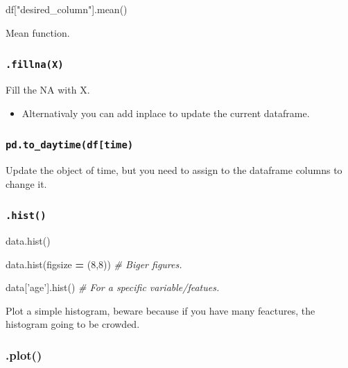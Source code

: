 \documentclass[]{book}
\newenvironment{Shaded}{\begin{snugshade}}{\end{snugshade}}
\newcommand{\DecValTok}[1]{\textcolor[rgb]{0.00,0.00,0.81}{#1}}
\newcommand{\StringTok}[1]{\textcolor[rgb]{0.31,0.60,0.02}{#1}}
\newcommand{\CommentTok}[1]{\textcolor[rgb]{0.56,0.35,0.01}{\textit{#1}}}
\newcommand{\OperatorTok}[1]{\textcolor[rgb]{0.81,0.36,0.00}{\textbf{#1}}}
\newcommand{\NormalTok}[1]{#1}
\providecommand{\tightlist}{%
  \setlength{\itemsep}{0pt}\setlength{\parskip}{0pt}}
\begin{document}
\begin{Shaded}
\begin{Highlighting}[]
\NormalTok{df[}\StringTok{"desired_column"}\NormalTok{].mean()}
\end{Highlighting}
\end{Shaded}

Mean function.

\subsubsection{\texorpdfstring{\texttt{.fillna(X)}}{.fillna(X)}}\label{fillnax}

Fill the NA with X.

\begin{itemize}
\tightlist
\item
  Alternativaly you can add inplace to update the current dataframe.
\end{itemize}

\subsubsection{\texorpdfstring{\texttt{pd.to\_daytime(df{[}\textquotesingle{}time\textquotesingle{}{]})}}{pd.to\_daytime(df{[}'time'{]})}}\label{pd.to_daytimedftime}

Update the object of time, but you need to assign to the dataframe
columns to change it.

\subsubsection{\texorpdfstring{\texttt{.hist()}}{.hist()}}\label{hist}

\begin{Shaded}
\begin{Highlighting}[]
\NormalTok{data.hist()}

\NormalTok{data.hist(figsize }\OperatorTok{=}\NormalTok{ (}\DecValTok{8}\NormalTok{,}\DecValTok{8}\NormalTok{)) }\CommentTok{# Biger figures.}

\NormalTok{data[}\StringTok{'age'}\NormalTok{].hist() }\CommentTok{# For a specific variable/featues.}
\end{Highlighting}
\end{Shaded}

Plot a simple histogram, beware because if you have many feactures, the
histogram going to be crowded.

\subsubsection{.plot()}\label{plot}
\end{document}
